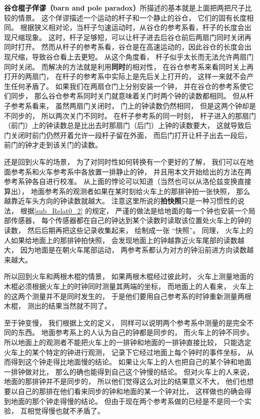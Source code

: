 \textbf{谷仓棍子佯谬（barn and pole paradox）}所描述的基本就是上面把两把尺子比较的情景。 这个佯谬描述一个运动的杆子和一个静止的谷仓， 它们的固有长度相同。 根据狭义相对论，当杆子匀速运动时，从谷仓的参考系看，杆子的长度会出现尺缩现象。 这时，杆子足够短，可以让杆子进去后谷仓前后两扇门同时关闭再同时打开。 然而从杆子的参考系看，谷仓是在高速运动的，因此谷仓的长度会出现尺缩，导致谷仓看上去更短。 从这个角度看， 杆子似乎太长而无法允许两扇门同时关闭。 而解决的方法就是利用\textbf{同时}的相对性， 在谷仓参考系来看同时关上再打开的两扇门， 在杆子的参考系中实际上是先后关上打开的， 这样一来就不会产生任何矛盾了。 如果我们在两扇仓门上分别安装一个钟， 并在谷仓的参考系使它们同步， 那么谷仓参考系同时关门就意味着关门时两个钟的读数都相同。 但从杆子参考系看来， 虽然两扇门关闭时， 门上的钟读数仍然相同， 但是这两个钟却是不同步的， 所以两次关门不同时。 在杆子参考系的同一时刻， 杆子进入的那扇门（前门）上的钟读数总是比出去时那扇门（后门）上钟的读数要大， 这就导致后门关闭时前门仍然开着允许一段杆子留在外面， 而后门打开让杆子出去一段后， 前门的钟才走到该关门的读数。

还是回到火车的场景， 为了对同时性如何转换有一个更好的了解， 我们可以在地面参考系和火车参考系中各放置一排静止的钟， 并且用本文开始给出的方法在两参考系钟各自进行校准。 从上面的悖论可以知道（当然也可以从洛伦兹变换直接算出）， 地面参考系的观测者如果在某时刻给火车上的那排钟拍一张快照， 那么越靠近车头方向的钟读数就越大。 注意这里所说的\textbf{拍快照}只是一种习惯性的说法， 根据\autoref{sub_Relat0_2} 的规定， 严谨的做法是给地面的每一个钟也安装一个局部传感器， 每个传感器都在自己的钟达到某个读数时读取该位置处火车上的钟的读数， 然后后期再把这些记录收集起来， 绘制成一张 “快照”。 同理， 火车上的人如果给地面上的那排钟拍快照， 会发现地面上的钟越靠近火车尾部的读数越大， 因为地面是在朝火车尾部运动， 两参考系都认为对方的钟沿前进方向读数越来越大。

所以回到火车和两根木棍的情景， 如果两根木棍经过彼此时， 火车上测量地面的木棍必须根据火车上的时钟同时测量其两端的坐标， 而地面上的人看来， 火车上的这两个测量并不是同时发生的， 于是他们要用自己参考系的时钟重新测量两根木棍， 测出的结果当然就不同了。

至于钟变慢， 我们根据上文的定义， 同样可以说明两个参考系中测量的是完全不同的东西。 地面参考系上的人认为自己的钟都是同步的， 而火车上的钟不同步。 所以地面上的观测者不能把火车上的一排钟和地面的一排钟直接比较， 只能选定火车上的某个特定的钟进行观测， 记录下它经过地面上每个钟时的事件坐标， 从而得到这个钟走得比地面慢的结论。 如果让火车上的人也把自己的某个钟和地面一排钟做对比， 那么的确也能得到自己这个钟慢的结论。 但对火车上的人来说， 地面的那排钟并不是同步的， 所以他们觉得这么对比的结果意义不大， 他们也想要以自己的那排在他们看来同步的钟和地面的某一个钟对比， 这样做也的确会得到地面的那个钟走得慢的结论。 但由于现在两个参考系做的已经是不是同一个实验， 互相觉得慢也就不矛盾了。

